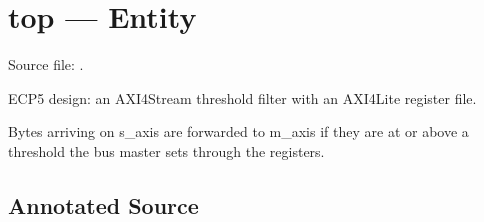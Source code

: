 \documentclass[letterpaper,10pt,english]{sphinxmanual}
\begin{document}
\section{top — Entity}
\label{\detokenize{modules/top/entity:top-entity}}\label{\detokenize{modules/top/entity::doc}}
\sphinxAtStartPar
Source file: .

\sphinxAtStartPar
ECP5 design: an AXI4\sphinxhyphen{}Stream threshold filter with an AXI4\sphinxhyphen{}Lite register file.

\sphinxAtStartPar
Bytes arriving on s\_axis are forwarded to m\_axis if they are at or above a
threshold the bus master sets through the registers.


\subsection{Annotated Source}
\label{\detokenize{modules/top/entity:annotated-source}}
\def\sphinxLiteralBlockLabel{\label{\detokenize{modules/top/entity:id1}}}
\end{document}
